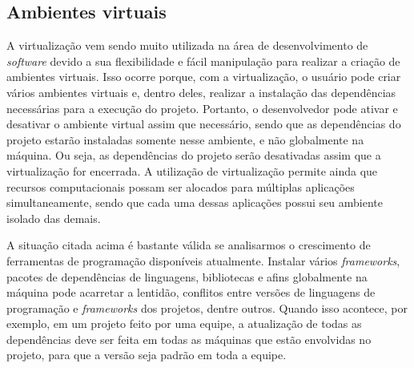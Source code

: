 \subsection{{Ambientes virtuais}}

A virtualização vem sendo muito utilizada na área de desenvolvimento de \textit{software} devido a sua flexibilidade e fácil manipulação para realizar a criação de ambientes virtuais. Isso ocorre porque, com a virtualização, o usuário pode criar vários ambientes virtuais e, dentro deles, realizar a instalação das dependências necessárias para a execução do projeto. Portanto, o desenvolvedor pode ativar e desativar o ambiente virtual assim que necessário, sendo que as dependências do projeto estarão instaladas somente nesse ambiente, e não globalmente na máquina. Ou seja, as dependências do projeto serão desativadas assim que a virtualização for encerrada. A utilização de virtualização permite ainda que recursos computacionais possam ser alocados para múltiplas aplicações simultaneamente, sendo que cada uma dessas aplicações possui seu ambiente isolado das demais.

A situação citada acima é bastante válida se analisarmos o crescimento de ferramentas de programação disponíveis atualmente. Instalar vários \textit{frameworks}, pacotes de dependências de linguagens, bibliotecas e afins globalmente na máquina pode acarretar a lentidão, conflitos entre versões de linguagens de programação e \textit{frameworks} dos projetos, dentre outros. Quando isso acontece, por exemplo, em um projeto feito por uma equipe, a atualização de todas as dependências deve ser feita em todas as máquinas que estão envolvidas no projeto, para que a versão seja padrão em toda a equipe.